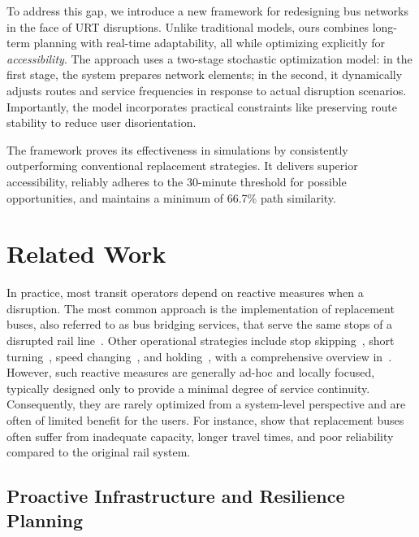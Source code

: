 \documentclass[3p,times,procedia]{elsarticle}
\begin{document}
To address this gap, we introduce a new framework for redesigning bus networks in the face of URT disruptions. Unlike traditional models, ours combines long-term planning with real-time adaptability, all while optimizing explicitly for \emph{accessibility}. The approach uses a two-stage stochastic optimization model: in the first stage, the system prepares network elements; in the second, it dynamically adjusts routes and service frequencies in response to actual disruption scenarios. Importantly, the model incorporates practical constraints like preserving route stability to reduce user disorientation.

The framework proves its effectiveness in simulations by consistently outperforming conventional replacement strategies. It delivers superior accessibility, reliably adheres to the 30-minute threshold for possible opportunities, and maintains a minimum of 66.7\% path similarity.

\section{Related Work}

In practice, most transit operators depend on reactive measures when a disruption. The most common approach is the implementation of replacement buses, also referred to as bus bridging services, that serve the same stops of a disrupted rail line~\citep{Pender2012,CurrieMuir2017}. Other operational strategies include stop skipping~\citep{Tang2018}, short turning~\citep{Peled2021}, speed changing~\citep{Manasra2019}, and holding~\citep{Olvera2023}, with a comprehensive overview in~\citep{Gkiotsalitis2022}.
%
However, such reactive measures are generally ad-hoc and locally focused, typically designed only to provide a minimal degree of service continuity. 
Consequently, they are rarely optimized from a system-level perspective and are often of limited benefit for the users. 
For instance, \citet{CurrieMuir2017} show that replacement buses often suffer from inadequate capacity, longer travel times, and poor reliability compared to the original rail system.

\subsection{Proactive Infrastructure and Resilience Planning}
\end{document}
